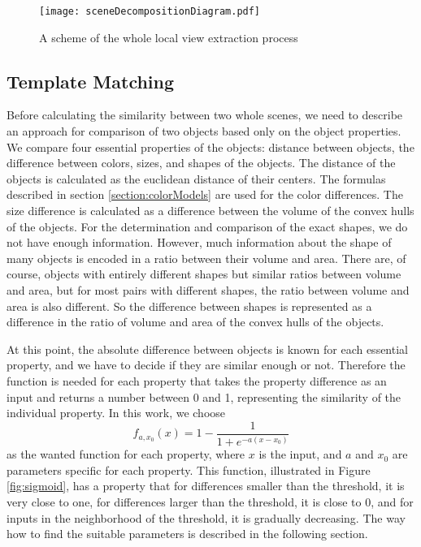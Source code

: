 \begin{figure}[htpb]
    \centering
    \texttt{[image: sceneDecompositionDiagram.pdf]}
    \caption{A scheme of the whole local view extraction process} \label{fig:sceneDecompositionDiagram}
\end{figure}

\subsection{Template Matching}

Before calculating the similarity between two whole scenes, we need to describe an approach for comparison of two objects based only on the object properties. We compare four essential properties of the objects: distance between objects, the difference between colors, sizes, and shapes of the objects. The distance of the objects is calculated as the euclidean distance of their centers. The formulas described in section \ref{section:colorModels} are used for the color differences. The size difference is calculated as a difference between the volume of the convex hulls of the objects. For the determination and comparison of the exact shapes, we do not have enough information. However, much information about the shape of many objects is encoded in a ratio between their volume and area. There are, of course, objects with entirely different shapes but similar ratios between volume and area, but for most pairs with different shapes, the ratio between volume and area is also different. So the difference between shapes is represented as a difference in the ratio of volume and area of the convex hulls of the objects.\par
At this point, the absolute difference between objects is known for each essential property, and we have to decide if they are similar enough or not. Therefore the function is needed for each property that takes the property difference as an input and returns a number between 0 and 1, representing the similarity of the individual property. In this work, we choose
$$
    f_{a,x_0}(x) = 1 - \frac{1}{1 + e^{-a(x-x_0)}}
$$
as the wanted function for each property, where $x$ is the input, and $a$ and $x_0$ are parameters specific for each property. This function, illustrated in Figure \ref{fig:sigmoid}, has a property that for differences smaller than the threshold, it is very close to one, for differences larger than the threshold, it is close to 0, and for inputs in the neighborhood of the threshold, it is gradually decreasing. The way how to find the suitable parameters is described in the following section.\par

